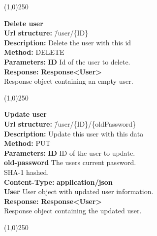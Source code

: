 \documentclass[11pt]{article}
\begin{document}
\begin{center}\line(1,0){250}\end{center}

\begin{tabbing}
\textbf{Delete user} \\
\textcolor{black!60}{\textbf{Url structure:}} \hspace{0.2in} \= /user/\{ID\} \\
\textcolor{black!60}{\textbf{Description:}}  \> Delete the user with this id \\
\textcolor{black!60}{\textbf{Method:}} \> DELETE \\
\textcolor{black!60}{\textbf{Parameters:}} \> \textbf{ID} Id of the user to delete. \\
\textcolor{black!60}{\textbf{Response:}} \> \textbf{Response<User>} \\
\> Response object containing an empty user.
\end{tabbing}

\begin{center}\line(1,0){250}\end{center}

\begin{tabbing}
\textbf{Update user} \\
\textcolor{black!60}{\textbf{Url structure:}} \hspace{0.2in} \= /user/\{ID\}/\{oldPassword\} \\
\textcolor{black!60}{\textbf{Description:}}  \> Update this user with this data \\
\textcolor{black!60}{\textbf{Method:}} \> PUT \\
\textcolor{black!60}{\textbf{Parameters:}} \> \textbf{ID} ID of the user to update. \\
\> \textbf{old-password} The users current password. \\ \> SHA-1 hashed. \\
\textcolor{black!60}{\textbf{Content-Type:}} \> \textbf{application/json} \\
\> \textbf{User} User object with updated user information. \\
\textcolor{black!60}{\textbf{Response:}} \> \textbf{Response<User>} \\
\> Response object containing the updated user.
\end{tabbing}

\begin{center}\line(1,0){250}\end{center}
\end{document}
